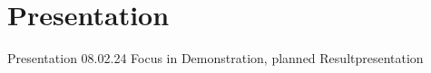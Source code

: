 \section{Presentation}
\label{sec:presentation}

Presentation 08.02.24
Focus in Demonstration, planned Resultpresentation

